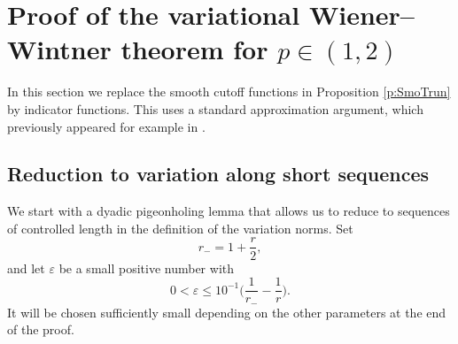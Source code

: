 \documentclass[12pt,reqno,a4paper,dvipsnames]{amsart}
\theoremstyle{plain}
\theoremstyle{definition}
\numberwithin{theorem}{section}
\numberwithin{equation}{section}
\begin{document}
\section{Proof of the variational Wiener--Wintner theorem for \texorpdfstring{$p \in (1,2)$}{p in (1,2)}}
\label{s:ShTruformSmoTru}

In this section we replace the smooth cutoff functions in Proposition \ref{p:SmoTrun} by indicator functions. This uses a standard approximation argument, which previously appeared for example in \cite{DOP}.

\subsection{Reduction to variation along short sequences}

We start with a dyadic pigeonholing lemma that allows us to reduce to sequences of controlled length in the definition of the variation norms. Set 
\begin{equation}
    \label{e:epsdef}
    r_- = 1 + \frac{r}{2}, 
\end{equation}
and let $\varepsilon$ be a small positive number with 
\begin{equation}
    0 < \varepsilon \le 10^{-1}\big(\frac{1}{r_-} - \frac{1}{r}\big).
\end{equation}
It will be chosen sufficiently small depending on the other parameters at the end of the proof. 
\end{document}
